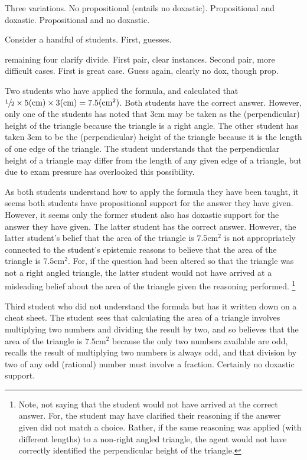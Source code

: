 \begin{note}[P/D Example]
  Three variations.
  No propositional (entails no doxastic).
  Propositional and doxastic.
  Propositional and no doxastic.

  Consider a handful of students.
  First, guesses.

  remaining four clarify divide.
  First pair, clear instances.
  Second pair, more difficult cases.
  First is great case.
  Guess again, clearly no dox, though prop.

  Two students who have applied the formula, and calculated that \(\sfrac{1}{2} \times 5\text{(cm)} \times 3\text{(cm)} = 7.5(\text{cm}^{2})\).
  Both students have the correct answer.
  However, only one of the students has noted that \(3\text{cm}\) may be taken as the (perpendicular) height of the triangle because the triangle is a right angle.
  The other student has taken \(3\text{cm}\) to be the (perpendicular) height of the triangle because it is the length of one edge of the triangle.
  The student understands that the perpendicular height of a triangle may differ from the length of any given edge of a triangle, but due to exam pressure has overlooked this possibility.

  As both students understand how to apply the formula they have been taught, it seems both students have propositional support for the answer they have given.
  However, it seems only the former student also has doxastic support for the answer they have given.
  The latter student has the correct answer.
  However, the latter student's belief that the area of the triangle is \(7.5\text{cm}^{2}\) is not appropriately connected to the student's epistemic reasons to believe that the area of the triangle is \(7.5\text{cm}^{2}\).
  For, if the question had been altered so that the triangle was not a right angled triangle, the latter student would not have arrived at a misleading belief about the area of the triangle given the reasoning performed.\nolinebreak
  \footnote{
    Note, not saying that the student would not have arrived at the correct answer.
    For, the student may have clarified their reasoning if the answer given did not match a choice.
    Rather, if the same reasoning was applied (with different lengths) to a non-right angled triangle, the agent would not have correctly identified the perpendicular height of the triangle.
  }

  Third student who did not understand the formula but has it written down on a cheat sheet.
  The student sees that calculating the area of a triangle involves multiplying two numbers and dividing the result by two, and so believes that the area of the triangle is \(7.5\text{cm}^{2}\) because the only two numbers available are odd, recalls the result of multiplying two numbers is always odd, and that division by two of any odd (rational) number must involve a fraction.
  Certainly no doxastic support.


\end{note}
